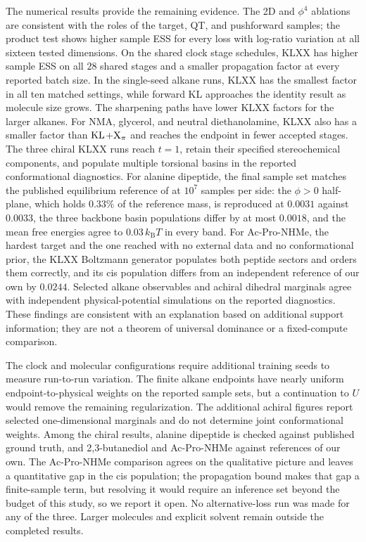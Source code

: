 \documentclass{article}
\begin{document}
The numerical results provide the remaining evidence. The 2D and $\phi^4$ ablations are consistent with the roles of the target, QT, and pushforward samples; the product test shows higher sample ESS for every loss with log-ratio variation at all sixteen tested dimensions. On the shared clock stage schedules, KLXX has higher sample ESS on all $28$ shared stages and a smaller propagation factor at every reported batch size. In the single-seed alkane runs, KLXX has the smallest factor in all ten matched settings, while forward KL approaches the identity result as molecule size grows. The sharpening paths have lower KLXX factors for the larger alkanes. For NMA, glycerol, and neutral diethanolamine, KLXX also has a smaller factor than $\mathrm{KL}$+$\mathrm{X}_\pi$ and reaches the endpoint in fewer accepted stages. The three chiral KLXX runs reach \(t=1\), retain their specified stereochemical components, and populate multiple torsional basins in the reported conformational diagnostics. For alanine dipeptide, the final sample set matches the published equilibrium reference of \citet{midgley2022flow} at \(10^7\) samples per side: the \(\phi>0\) half-plane, which holds \(0.33\%\) of the reference mass, is reproduced at \(0.0031\) against \(0.0033\), the three backbone basin populations differ by at most \(0.0018\), and the mean free energies agree to \(0.03\,k_{\mathrm B}T\) in every band. For Ac-Pro-NHMe, the hardest target and the one reached with no external data and no conformational prior, the KLXX Boltzmann generator populates both peptide sectors and orders them correctly, and its cis population differs from an independent reference of our own by \(0.0244\). Selected alkane observables and achiral dihedral marginals agree with independent physical-potential simulations on the reported diagnostics. These findings are consistent with an explanation based on additional support information; they are not a theorem of universal dominance or a fixed-compute comparison.

The clock and molecular configurations require additional training seeds to measure run-to-run variation. The finite alkane endpoints have nearly uniform endpoint-to-physical weights on the reported sample sets, but a continuation to $U$ would remove the remaining regularization. The additional achiral figures report selected one-dimensional marginals and do not determine joint conformational weights. Among the chiral results, alanine dipeptide is checked against published ground truth, and 2,3-butanediol and Ac-Pro-NHMe against references of our own. The Ac-Pro-NHMe comparison agrees on the qualitative picture and leaves a quantitative gap in the cis population; the propagation bound makes that gap a finite-sample term, but resolving it would require an inference set beyond the budget of this study, so we report it open. No alternative-loss run was made for any of the three. Larger molecules and explicit solvent remain outside the completed results.
\end{document}

